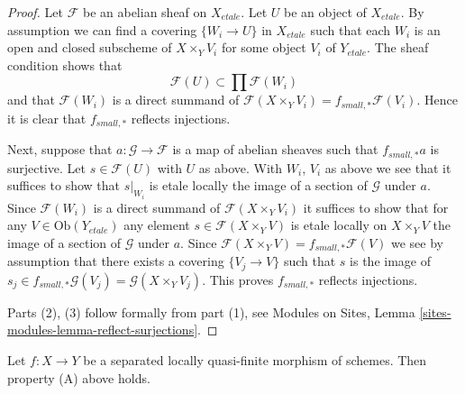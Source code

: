 \begin{proof}
Let $\mathcal{F}$ be an abelian sheaf on $X_{etale}$.
Let $U$ be an object of $X_{etale}$. By assumption we can find a
covering $\{W_i \to U\}$ in $X_{etale}$ such that each $W_i$ is
an open and closed subscheme of $X \times_Y V_i$ for some object
$V_i$ of $Y_{etale}$. The sheaf condition shows that
$$
\mathcal{F}(U) \subset \prod \mathcal{F}(W_i)
$$
and that $\mathcal{F}(W_i)$ is a direct summand of
$\mathcal{F}(X \times_Y V_i) = f_{small, *}\mathcal{F}(V_i)$.
Hence it is clear that $f_{small, *}$ reflects injections.

\medskip\noindent
Next, suppose that $a : \mathcal{G} \to \mathcal{F}$ is a map of
abelian sheaves such that $f_{small, *}a$ is surjective. Let
$s \in \mathcal{F}(U)$ with $U$ as above. With $W_i$, $V_i$ as
above we see that it suffices to show that $s|_{W_i}$ is etale locally
the image of a section of $\mathcal{G}$ under $a$. Since $\mathcal{F}(W_i)$
is a direct summand of $\mathcal{F}(X \times_Y V_i)$
it suffices to show that for any $V \in \text{Ob}(Y_{etale})$
any element $s \in \mathcal{F}(X \times_Y V)$
is etale locally on $X \times_Y V$ the image of a section of
$\mathcal{G}$ under $a$. Since
$\mathcal{F}(X \times_Y V) = f_{small, *}\mathcal{F}(V)$
we see by assumption that there exists a covering $\{V_j \to V\}$ such that
$s$ is the image of
$s_j \in f_{small, *}\mathcal{G}(V_j) = \mathcal{G}(X \times_Y V_j)$.
This proves $f_{small, *}$ reflects injections.

\medskip\noindent
Parts (2), (3) follow formally from part (1), see
Modules on Sites, Lemma \ref{sites-modules-lemma-reflect-surjections}.
\end{proof}

\begin{lemma}
\label{lemma-locally-quasi-finite-A}
Let $f : X \to Y$ be a separated locally quasi-finite morphism of schemes.
Then property (A) above holds.
\end{lemma}

